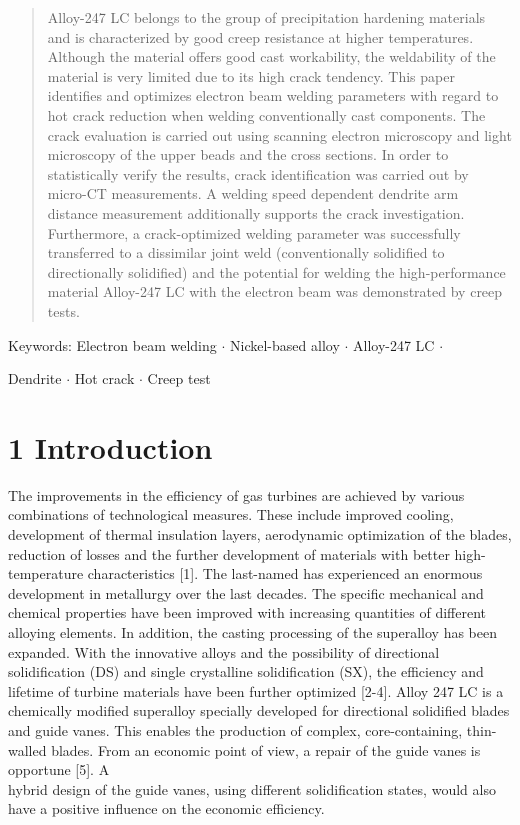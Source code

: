 \documentclass[10pt]{article}
\begin{document}
\begin{abstract}
Alloy-247 LC belongs to the group of precipitation hardening materials and is characterized by good creep resistance at higher temperatures. Although the material offers good cast workability, the weldability of the material is very limited due to its high crack tendency. This paper identifies and optimizes electron beam welding parameters with regard to hot crack reduction when welding conventionally cast components. The crack evaluation is carried out using scanning electron microscopy and light microscopy of the upper beads and the cross sections. In order to statistically verify the results, crack identification was carried out by micro-CT measurements. A welding speed dependent dendrite arm distance measurement additionally supports the crack investigation. Furthermore, a crack-optimized welding parameter was successfully transferred to a dissimilar joint weld (conventionally solidified to directionally solidified) and the potential for welding the high-performance material Alloy-247 LC with the electron beam was demonstrated by creep tests.
\end{abstract}

Keywords: Electron beam welding $\cdot$ Nickel-based alloy $\cdot$ Alloy-247 LC $\cdot$

Dendrite $\cdot$ Hot crack $\cdot$ Creep test

\section*{1 Introduction}
The improvements in the efficiency of gas turbines are achieved by various combinations of technological measures. These include improved cooling, development of thermal insulation layers, aerodynamic optimization of the blades, reduction of losses and the further development of materials with better high-temperature characteristics [1]. The last-named has experienced an enormous development in metallurgy over the last decades. The specific mechanical and chemical properties have been improved with increasing quantities of different alloying elements. In addition, the casting processing of the superalloy has been expanded. With the innovative alloys and the possibility of directional solidification (DS) and single crystalline solidification (SX), the efficiency and lifetime of turbine materials have been further optimized [2-4]. Alloy 247 LC is a chemically modified superalloy specially developed for directional solidified blades and guide vanes. This enables the production of complex, core-containing, thin-walled blades. From an economic point of view, a repair of the guide vanes is opportune [5]. A\\
hybrid design of the guide vanes, using different solidification states, would also have a positive influence on the economic efficiency.
\end{document}
